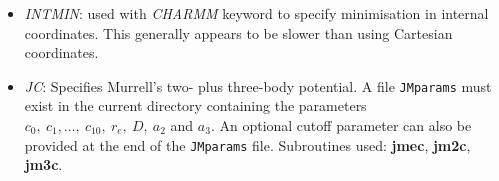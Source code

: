 \documentclass[12pt,a4paper,dvips]{article}
\begin{document}
\begin{itemize}



\item{\it INTMIN}: used with {\it CHARMM} keyword to specify minimisation in internal 
coordinates. This generally appears to be
slower than using Cartesian coordinates.

\item{\it JC}: Specifies Murrell's two- plus three-body
potential.\cite{murrellm90,murrellr90,alderzijmr91,eggenjlm92,fengjm93}
A file {\tt JMparams} must
exist in the current directory containing the parameters $c_0,\ c_1,\ldots,\ c_{10},\ r_e,\
D,\ a_2$ and $a_3$. An optional cutoff parameter can also be provided at the end of the
{\tt JMparams} file.
Subroutines used: {\bf jmec}, {\bf jm2c}, {\bf jm3c}.


\end{itemize}
\end{document}
